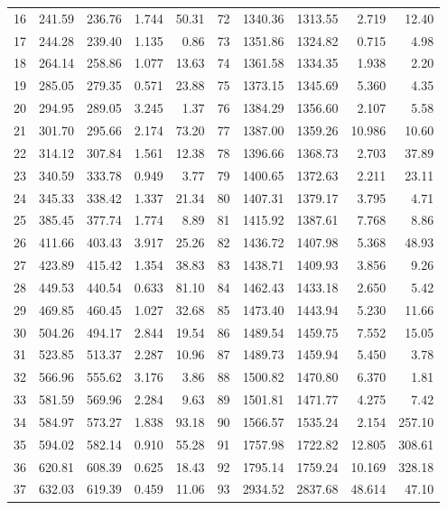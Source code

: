 \documentclass[11pt,a4paper]{article}
\begin{document}
\begin{longtable}{rrrrr@{\hskip 1.6em}rrrrr}
16 & 241.59 & 236.76 & 1.744 & 50.31 & 72 & 1340.36 & 1313.55 & 2.719 & 12.40 \\
17 & 244.28 & 239.40 & 1.135 & 0.86 & 73 & 1351.86 & 1324.82 & 0.715 & 4.98 \\
18 & 264.14 & 258.86 & 1.077 & 13.63 & 74 & 1361.58 & 1334.35 & 1.938 & 2.20 \\
19 & 285.05 & 279.35 & 0.571 & 23.88 & 75 & 1373.15 & 1345.69 & 5.360 & 4.35 \\
20 & 294.95 & 289.05 & 3.245 & 1.37 & 76 & 1384.29 & 1356.60 & 2.107 & 5.58 \\
21 & 301.70 & 295.66 & 2.174 & 73.20 & 77 & 1387.00 & 1359.26 & 10.986 & 10.60 \\
22 & 314.12 & 307.84 & 1.561 & 12.38 & 78 & 1396.66 & 1368.73 & 2.703 & 37.89 \\
23 & 340.59 & 333.78 & 0.949 & 3.77 & 79 & 1400.65 & 1372.63 & 2.211 & 23.11 \\
24 & 345.33 & 338.42 & 1.337 & 21.34 & 80 & 1407.31 & 1379.17 & 3.795 & 4.71 \\
25 & 385.45 & 377.74 & 1.774 & 8.89 & 81 & 1415.92 & 1387.61 & 7.768 & 8.86 \\
26 & 411.66 & 403.43 & 3.917 & 25.26 & 82 & 1436.72 & 1407.98 & 5.368 & 48.93 \\
27 & 423.89 & 415.42 & 1.354 & 38.83 & 83 & 1438.71 & 1409.93 & 3.856 & 9.26 \\
28 & 449.53 & 440.54 & 0.633 & 81.10 & 84 & 1462.43 & 1433.18 & 2.650 & 5.42 \\
29 & 469.85 & 460.45 & 1.027 & 32.68 & 85 & 1473.40 & 1443.94 & 5.230 & 11.66 \\
30 & 504.26 & 494.17 & 2.844 & 19.54 & 86 & 1489.54 & 1459.75 & 7.552 & 15.05 \\
31 & 523.85 & 513.37 & 2.287 & 10.96 & 87 & 1489.73 & 1459.94 & 5.450 & 3.78 \\
32 & 566.96 & 555.62 & 3.176 & 3.86 & 88 & 1500.82 & 1470.80 & 6.370 & 1.81 \\
33 & 581.59 & 569.96 & 2.284 & 9.63 & 89 & 1501.81 & 1471.77 & 4.275 & 7.42 \\
34 & 584.97 & 573.27 & 1.838 & 93.18 & 90 & 1566.57 & 1535.24 & 2.154 & 257.10 \\
35 & 594.02 & 582.14 & 0.910 & 55.28 & 91 & 1757.98 & 1722.82 & 12.805 & 308.61 \\
36 & 620.81 & 608.39 & 0.625 & 18.43 & 92 & 1795.14 & 1759.24 & 10.169 & 328.18 \\
37 & 632.03 & 619.39 & 0.459 & 11.06 & 93 & 2934.52 & 2837.68 & 48.614 & 47.10 \\

\end{longtable}
\end{document}
